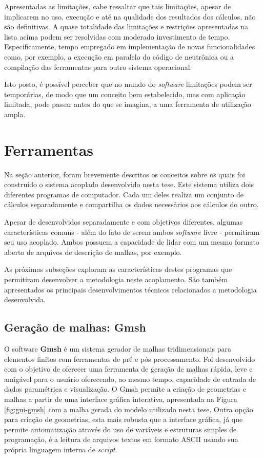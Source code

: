 Apresentadas as limitações, cabe ressaltar que tais limitações, apesar de implicarem no uso,
execução e até na qualidade dos resultados dos cálculos, não são definitivas.
A quase totalidade das limitações e restrições apresentadas na lista
acima podem ser resolvidas com moderado investimento de tempo. Especificamente, tempo empregado em implementação
de novas funcionalidades como, por exemplo, a execução em paralelo do código de neutrônica ou a compilação
das ferramentas para outro sistema operacional.

Isto posto, é possível perceber que no mundo do \textit{software} limitações podem ser temporárias, de modo que um
conceito bem estabelecido, mas com aplicação limitada, pode passar antes do que se imagina, a uma ferramenta de utilização ampla.

\section{Ferramentas}
\label{sec:ferr}

Na seção anterior, foram brevemente descritos os conceitos sobre os quais foi construído
o sistema acoplado desenvolvido nesta tese. Este
sistema utiliza dois diferentes programas de computador. Cada um deles
realiza um conjunto de cálculos separadamente e compartilha os dados necessários aos cálculos do outro.

Apesar de desenvolvidos separadamente e com objetivos diferentes, algumas características comuns - além
do fato de serem ambos \textit{software} livre - permitiram seu uso acoplado. Ambos possuem a capacidade de lidar
com um mesmo formato aberto de arquivos de descrição de malhas, por exemplo.


As próximas subseções exploram as características destes programas que permitiram desenvolver
a metodologia neste acoplamento. São também apresentados os principais desenvolvimentos técnicos
relacionados a metodologia desenvolvida.

\subsection{Geração de malhas: \textbf{Gmsh}}
\label{subsection:gmsh}

O software \textbf{Gmsh} \cite{Geuzane2009} é um sistema gerador de malhas tridimensionais
para elementos finitos com ferramentas de pré e pós processamento. Foi desenvolvido com o objetivo
de oferecer uma ferramenta de geração de malhas rápida, leve e amigável para o usuário oferecendo,
ao mesmo tempo, capacidade de entrada de dados paramétrica e visualização. O Gmsh permite
a criação de geometrias e malhas a partir de uma interface gráfica interativa, apresentada
na Figura \ref{fig:gui-gmsh} com a malha gerada do modelo utilizado nesta tese. Outra opção
para criação de geometrias, esta mais robusta que a interface gráfica, já que permite
automatização através do uso de variáveis e estruturas simples de programação, é a leitura
de arquivos textos em formato ASCII usando sua própria linguagem interna de \textit{script}.

